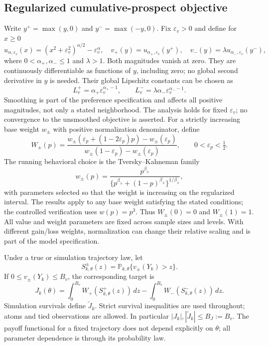 \documentclass[11pt]{article}
\newcommand{\Pp}{\mathbb P}
\newcommand{\1}{\mathbf 1}
\newcommand{\eps}{\varepsilon}
\theoremstyle{definition}
\begin{document}
\subsection{Regularized cumulative-prospect objective}
Write $y^+=\max(y,0)$ and $y^-=\max(-y,0)$. Fix $\eps_v>0$ and define for $x\ge0$
\begin{equation}\label{eq:value-functions}
 u_{\alpha,\eps_v}(x)=(x^2+\eps_v^2)^{\alpha/2}-\eps_v^\alpha,
 \quad v_+(y)=u_{\alpha_+,\eps_v}(y^+),\quad
 v_-(y)=\lambda u_{\alpha_-,\eps_v}(y^-),
\end{equation}
where $0<\alpha_+,\alpha_-\le1$ and $\lambda>1$. Both magnitudes vanish at zero. They are continuously differentiable as functions of $y$, including zero; no global second derivative in $y$ is needed. Their global Lipschitz constants can be chosen as
\begin{equation}\label{eq:value-lipschitz}
 L_v^+=\alpha_+\eps_v^{\alpha_+-1},\qquad
 L_v^-=\lambda\alpha_-\eps_v^{\alpha_--1}.
\end{equation}
Smoothing is part of the preference specification and affects all positive magnitudes, not only a stated neighborhood. The analysis holds for fixed $\eps_v$; no convergence to the unsmoothed objective is asserted.
For a strictly increasing base weight $w_\pm$ with positive normalization denominator, define
\begin{equation}\label{eq:prob-weights}
 W_\pm(p)=
 \frac{w_\pm(\eps_p+(1-2\eps_p)p)-w_\pm(\eps_p)}
 {w_\pm(1-\eps_p)-w_\pm(\eps_p)},\qquad 0<\eps_p<\tfrac12.
\end{equation}
The running behavioral choice is the Tversky--Kahneman family
\[
 w_\pm(p)=\frac{p^{\beta_\pm}}
 {\{p^{\beta_\pm}+(1-p)^{\beta_\pm}\}^{1/\beta_\pm}},
\]
with parameters selected so that the weight is increasing on the regularized interval. The results apply to any base weight satisfying the stated conditions; the controlled verification uses $w(p)=p^3$. Thus $W_\pm(0)=0$ and $W_\pm(1)=1$. All value and weight parameters are fixed across sample sizes and levels. With different gain/loss weights, normalization can change their relative scaling and is part of the model specification.

Under a true or simulation trajectory law, let
\[
 S_{k,\theta}^{\pm}(z)=\Pp_{k,\theta}\{v_\pm(Y_k)>z\}.
\]
If $0\le v_\pm(Y_k)\le B_v$, the corresponding target is
\begin{equation}\label{eq:cpt-objective}
 J_k(\theta)=\int_0^{B_v}W_+(S_{k,\theta}^+(z))\,dz
 -\int_0^{B_v}W_-(S_{k,\theta}^-(z))\,dz.
\end{equation}
Simulation survivals define $\widetilde J_k$. Strict survival inequalities are used throughout; atoms and tied observations are allowed. In particular $|J_k|,|\widetilde J_k|\le B_J:=B_v$. The payoff functional for a fixed trajectory does not depend explicitly on $\theta$; all parameter dependence is through its probability law.
\end{document}
